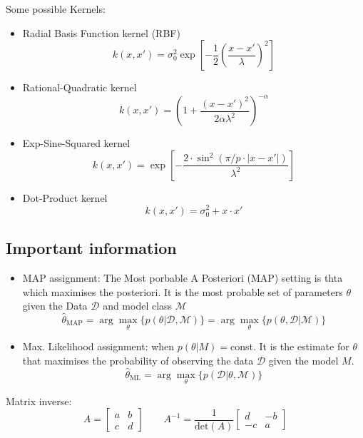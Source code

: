 Some possible Kernels:
\begin{itemize}
    \item Radial Basis Function kernel (RBF)
    \[
    k(x,x') = \sigma_0^2\exp\left[-\frac{1}{2}(\frac{x-x'}{\lambda})^2\right]
    \]
    \item Rational-Quadratic kernel
    \[
    k(x,x') = \left(1 + \frac{(x-x')^2}{2\alpha\lambda^2}\right)^{-\alpha}
    \]
    \item Exp-Sine-Squared kernel
    \[
    k(x,x') = \exp\left[-\frac{2 \cdot \sin^2(\pi/p \cdot |x-x'|)}{\lambda^2}\right]
    \]
    \item Dot-Product kernel
    \[
    k(x,x') = \sigma^2_0 + x\cdot x'
    \]
\end{itemize}

\subsection{Important information}
\begin{itemize}
    \item MAP assignment: The Most porbable A Posteriori (MAP) setting is thta which maximises the posteriori. It is the most probable set of parameters \(\theta\) given the Data \(\mathcal{D}\) and model class \(\mathcal{M}\)
    \[
    \hat{\theta}_{\text{MAP}} = \arg\max_\theta\{p(\theta|\mathcal{D},\mathcal{M})\} = \arg\max_\theta \{p(\theta,\mathcal{D}|\mathcal{M})\}
    \]
    \item Max. Likelihood assignment: when \(p(\theta|M) = \)const. It is the estimate for \(\theta\) that maximises the probability of observing the data \(\mathcal{D}\) given the model \(M\).
    \[
    \hat{\theta}_{\text{ML}} = \arg\max_\theta\{p(\mathcal{D}|\theta,\mathcal{M})\}
    \]
\end{itemize}
Matrix inverse:
\[
A = 
\begin{bmatrix}
a & b \\
c & d
\end{bmatrix}
\qquad
A^{-1} = \frac{1}{\text{det}(A)}
\begin{bmatrix}
d & -b \\
-c & a
\end{bmatrix}
\]
